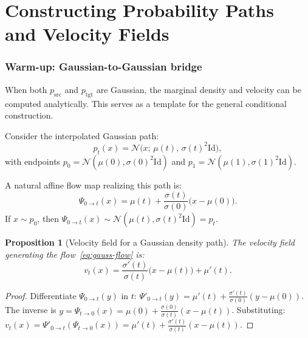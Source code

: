 \documentclass[11pt]{article}
\newcommand{\cN}{\mathcal{N}}
\newcommand{\Id}{\mathrm{Id}}
\newtheorem{proposition}[theorem]{Proposition}
\theoremstyle{definition}
\theoremstyle{remark}
\begin{document}
\newpage

\part{Constructing Probability Paths and Velocity Fields}

\section{Warm-up: Gaussian-to-Gaussian bridge}\label{sec:gauss-bridge}

When both $p_{\mathrm{src}}$ and $p_{\mathrm{tgt}}$ are Gaussian, the marginal density and velocity can be computed analytically.
This serves as a template for the general conditional construction.

Consider the interpolated Gaussian path:
\begin{equation}\label{eq:gauss-path}
p_t(x) = \cN\!\big(x;\,\mu(t),\,\sigma(t)^2 \Id\big),
\end{equation}
with endpoints $p_0 = \cN(\mu(0), \sigma(0)^2\Id)$ and $p_1 = \cN(\mu(1), \sigma(1)^2\Id)$.

A natural affine flow map realizing this path is:
\begin{equation}\label{eq:gauss-flow}
\Psi_{0\to t}(x) = \mu(t) + \frac{\sigma(t)}{\sigma(0)}\big(x - \mu(0)\big).
\end{equation}
If $x\sim p_0$, then $\Psi_{0\to t}(x) \sim \cN(\mu(t), \sigma(t)^2\Id) = p_t$.

\begin{proposition}[Velocity field for a Gaussian density path]\label{prop:gauss-velocity}
The velocity field generating the flow~\eqref{eq:gauss-flow} is:
\begin{equation}\label{eq:gauss-velocity}
v_t(x) = \frac{\sigma'(t)}{\sigma(t)}\big(x - \mu(t)\big) + \mu'(t).
\end{equation}
\end{proposition}

\begin{proof}
Differentiate $\Psi_{0\to t}(y)$ in $t$:
$\Psi'_{0\to t}(y) = \mu'(t) + \frac{\sigma'(t)}{\sigma(0)}(y - \mu(0))$.
The inverse is $y = \Psi_{t\to 0}(x) = \mu(0) + \frac{\sigma(0)}{\sigma(t)}(x - \mu(t))$.
Substituting:
$v_t(x) = \Psi'_{0\to t}(\Psi_{t\to 0}(x)) = \mu'(t) + \frac{\sigma'(t)}{\sigma(t)}(x - \mu(t))$.
\end{proof}
\end{document}
